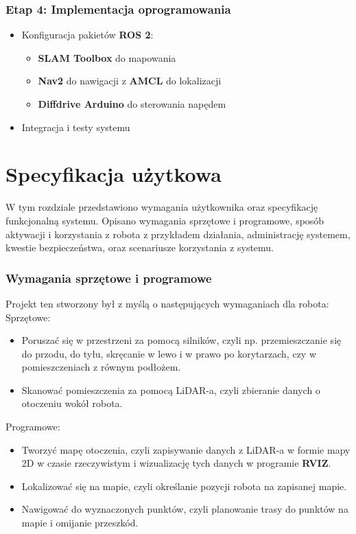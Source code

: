 \documentclass[a4paper,twoside,12pt]{book}
\begin{document}
\subsection{Etap 4: Implementacja oprogramowania}
\begin{itemize}
\item Konfiguracja pakietów \textbf{ROS 2}:
	\begin{itemize}
	\item \textbf{SLAM Toolbox} do mapowania
	\item \textbf{Nav2} do nawigacji z \textbf{AMCL} do lokalizacji
	\item \textbf{Diffdrive Arduino}  do sterowania napędem
	\end{itemize}
\item Integracja i testy systemu
\end{itemize}



\chapter{Specyfikacja użytkowa}
\label{ch:04}
W tym rozdziale przedstawiono wymagania użytkownika oraz specyfikację funkcjonalną systemu. Opisano wymagania sprzętowe i programowe, sposób aktywacji i korzystania z robota z przykładem działania, administrację systemem, kwestie bezpieczeństwa, oraz scenariusze korzystania z systemu.


\subsection{Wymagania sprzętowe i programowe}
Projekt ten stworzony był z myślą o następujących wymaganiach dla robota:
\newline\newline
Sprzętowe:
\begin{itemize}
	\item Poruszać się w przestrzeni za pomocą silników, czyli np. przemieszczanie się do przodu, do tyłu, skręcanie w lewo i w prawo po korytarzach, czy w pomieszczeniach z równym podłożem.
	\item Skanować pomieszczenia za pomocą LiDAR-a, czyli zbieranie danych o otoczeniu wokół robota.
	\end{itemize}
Programowe:
\begin{itemize}
	\item Tworzyć mapę otoczenia, czyli zapisywanie danych z LiDAR-a w formie mapy 2D w czasie rzeczywistym i wizualizację tych danych w programie \textbf{RVIZ}.
	\item Lokalizować się na mapie, czyli określanie pozycji robota na zapisanej mapie.
	\item Nawigować do wyznaczonych punktów, czyli planowanie trasy do punktów na mapie i omijanie przeszkód.
\end{itemize}
\newpage
\end{document}
